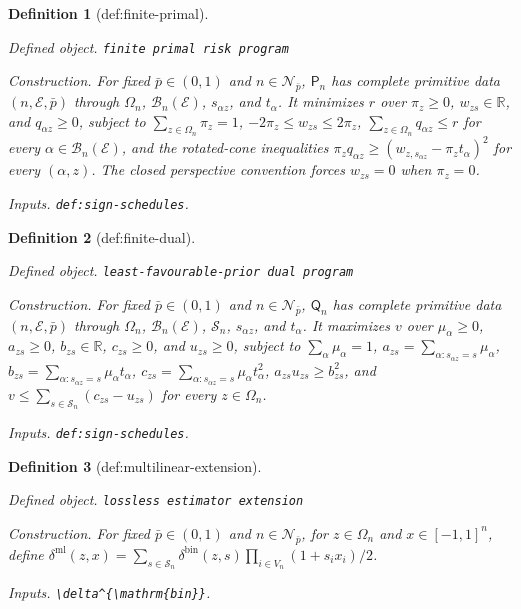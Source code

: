 \documentclass{article}
\newtheorem{definition}{Definition}
\begin{document}
\begin{definition}[def:finite-primal]\label{def:finite-primal}
\par\smallskip\noindent\emph{Defined object.} \texttt{finite primal risk program}
\par\smallskip\noindent\emph{Construction.} For fixed \(\bar p\in(0,1)\) and \(n\in\mathcal N_{\bar p}\), \(\mathsf P_n\) has complete primitive data \((n,\mathcal E,\bar p)\) through \(\Omega_n\), \(\mathcal B_n(\mathcal E)\), \(s_{\alpha z}\), and \(t_\alpha\). It minimizes \(r\) over \(\pi_z\ge0\), \(w_{zs}\in\mathbb R\), and \(q_{\alpha z}\ge0\), subject to \(\sum_{z\in\Omega_n}\pi_z=1\), \(-2\pi_z\le w_{zs}\le2\pi_z\), \(\sum_{z\in\Omega_n}q_{\alpha z}\le r\) for every \(\alpha\in\mathcal B_n(\mathcal E)\), and the rotated-cone inequalities \(\pi_zq_{\alpha z}\ge(w_{z,s_{\alpha z}}-\pi_zt_\alpha)^2\) for every \((\alpha,z)\). The closed perspective convention forces \(w_{zs}=0\) when \(\pi_z=0\).
\par\smallskip\noindent\emph{Inputs.} \texttt{def:\allowbreak{}sign-\allowbreak{}schedules}.
\end{definition}

\begin{definition}[def:finite-dual]\label{def:finite-dual}
\par\smallskip\noindent\emph{Defined object.} \texttt{least-\allowbreak{}favourable-\allowbreak{}prior dual program}
\par\smallskip\noindent\emph{Construction.} For fixed \(\bar p\in(0,1)\) and \(n\in\mathcal N_{\bar p}\), \(\mathsf Q_n\) has complete primitive data \((n,\mathcal E,\bar p)\) through \(\Omega_n\), \(\mathcal B_n(\mathcal E)\), \(\mathcal S_n\), \(s_{\alpha z}\), and \(t_\alpha\). It maximizes \(v\) over \(\mu_\alpha\ge0\), \(a_{zs}\ge0\), \(b_{zs}\in\mathbb R\), \(c_{zs}\ge0\), and \(u_{zs}\ge0\), subject to \(\sum_\alpha\mu_\alpha=1\), \(a_{zs}=\sum_{\alpha:s_{\alpha z}=s}\mu_\alpha\), \(b_{zs}=\sum_{\alpha:s_{\alpha z}=s}\mu_\alpha t_\alpha\), \(c_{zs}=\sum_{\alpha:s_{\alpha z}=s}\mu_\alpha t_\alpha^2\), \(a_{zs}u_{zs}\ge b_{zs}^2\), and \(v\le\sum_{s\in\mathcal S_n}(c_{zs}-u_{zs})\) for every \(z\in\Omega_n\).
\par\smallskip\noindent\emph{Inputs.} \texttt{def:\allowbreak{}sign-\allowbreak{}schedules}.
\end{definition}

\begin{definition}[def:multilinear-extension]\label{def:multilinear-extension}
\par\smallskip\noindent\emph{Defined object.} \texttt{lossless estimator extension}
\par\smallskip\noindent\emph{Construction.} For fixed \(\bar p\in(0,1)\) and \(n\in\mathcal N_{\bar p}\), for \(z\in\Omega_n\) and \(x\in[-1,1]^n\), define \(\delta^{\mathrm{ml}}(z,x)=\sum_{s\in\mathcal S_n}\delta^{\mathrm{bin}}(z,s)\prod_{i\in V_n}(1+s_ix_i)/2\).
\par\smallskip\noindent\emph{Inputs.} \texttt{\textbackslash{}\allowbreak{}delta\textasciicircum{}\{\textbackslash{}\allowbreak{}mathrm\{bin\}\allowbreak{}\}\allowbreak{}}.
\end{definition}
\end{document}
